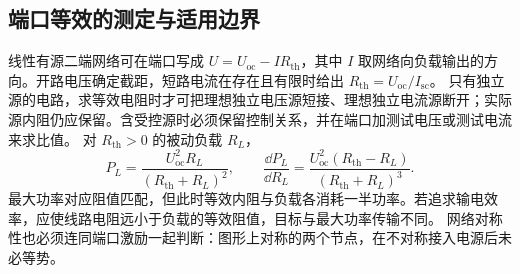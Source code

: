 \subsection{端口等效的测定与适用边界}
线性有源二端网络可在端口写成 $U=U_{\mathrm{oc}}-IR_{\mathrm{th}}$，其中 $I$ 取网络向负载输出的方向。开路电压确定截距，短路电流在存在且有限时给出 $R_{\mathrm{th}}=U_{\mathrm{oc}}/I_{\mathrm{sc}}$。
只有独立源的电路，求等效电阻时才可把理想独立电压源短接、理想独立电流源断开；实际源内阻仍应保留。含受控源时必须保留控制关系，并在端口加测试电压或测试电流来求比值。
对 $R_{\mathrm{th}}>0$ 的被动负载 $R_L$，
\[
 P_L=\frac{U_{\mathrm{oc}}^2R_L}{(R_{\mathrm{th}}+R_L)^2},\qquad
 \frac{\dd P_L}{\dd R_L}=\frac{U_{\mathrm{oc}}^2(R_{\mathrm{th}}-R_L)}{(R_{\mathrm{th}}+R_L)^3}.
\]
最大功率对应阻值匹配，但此时等效内阻与负载各消耗一半功率。若追求输电效率，应使线路电阻远小于负载的等效阻值，目标与最大功率传输不同。
网络对称性也必须连同端口激励一起判断：图形上对称的两个节点，在不对称接入电源后未必等势。

